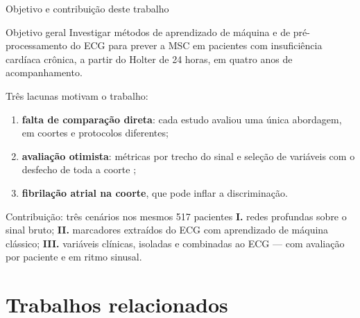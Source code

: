 \documentclass[10pt,aspectratio=169]{beamer}
\begin{document}
\begin{frame}{Objetivo e contribuição deste trabalho}
  \small
  \begin{block}{Objetivo geral}
    Investigar métodos de aprendizado de máquina e de pré-processamento do
    ECG para prever a MSC em pacientes com insuficiência cardíaca crônica, a
    partir do Holter de 24 horas, em quatro anos de acompanhamento.
  \end{block}
  Três lacunas motivam o trabalho:
  \begin{enumerate}\footnotesize
    \item \textbf{falta de comparação direta}: cada estudo avaliou uma única
      abordagem, em coortes e protocolos diferentes;
    \item \textbf{avaliação otimista}: métricas por trecho do sinal e seleção
      de variáveis com o desfecho de toda a coorte \cite{kapoor2023leakage};
    \item \textbf{fibrilação atrial na coorte}, que pode inflar a
      discriminação.
  \end{enumerate}
  \vspace{0.2em}
  \begin{block}{Contribuição: três cenários nos mesmos 517 pacientes}
    \textbf{I.} redes profundas sobre o sinal bruto; \textbf{II.} marcadores
    extraídos do ECG com aprendizado de máquina clássico; \textbf{III.}
    variáveis clínicas, isoladas e combinadas ao ECG --- com avaliação por
    paciente e em ritmo sinusal.
  \end{block}
\end{frame}

\section{Trabalhos relacionados}
\end{document}
